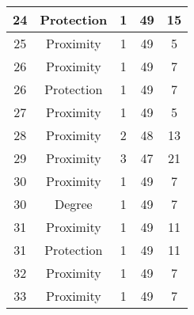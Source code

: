 \documentclass[results.tex]{subfiles}
\begin{document}
\begin{center}
\begin{tabular}{| c || c | c | c | c |}
            \hline
            24                      & Protection                   & 1                      & 49                      & 15                   \\
            \hline
            25                      & Proximity                    & 1                      & 49                      & 5                    \\
            \hline
            26                      & Proximity                    & 1                      & 49                      & 7                    \\
            \hline
            26                      & Protection                   & 1                      & 49                      & 7                    \\
            \hline
            27                      & Proximity                    & 1                      & 49                      & 5                    \\
            \hline
            28                      & Proximity                    & 2                      & 48                      & 13                   \\
            \hline
            29                      & Proximity                    & 3                      & 47                      & 21                   \\
            \hline
            30                      & Proximity                    & 1                      & 49                      & 7                    \\
            \hline
            30                      & Degree                       & 1                      & 49                      & 7                    \\
            \hline
            31                      & Proximity                    & 1                      & 49                      & 11                   \\
            \hline
            31                      & Protection                   & 1                      & 49                      & 11                   \\
            \hline
            32                      & Proximity                    & 1                      & 49                      & 7                    \\
            \hline
            33                      & Proximity                    & 1                      & 49                      & 7                    \\

\end{tabular}
\end{center}
\end{document}
